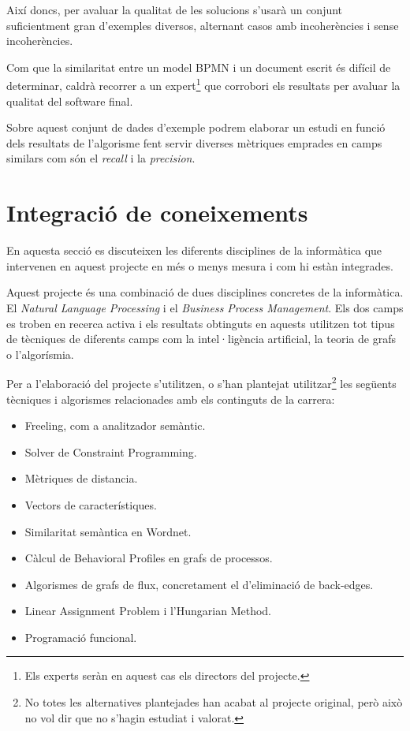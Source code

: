 Així doncs, per avaluar la qualitat de les solucions s'usarà un conjunt suficientment gran d'exemples diversos, alternant casos amb incoherències i sense incoherències. 

Com que la similaritat entre un model BPMN i un document escrit és difícil de determinar, caldrà recorrer a un expert\footnote{Els experts seràn en aquest cas els directors del projecte.} que corrobori els resultats per avaluar la qualitat del software final.

Sobre aquest conjunt de dades d'exemple podrem elaborar un estudi en funció dels resultats de l'algorisme fent servir diverses mètriques emprades en camps similars com són el \emph{recall} i la \emph{precision}.



\section{Integració de coneixements}
\label{integracio}
En aquesta secció es discuteixen les diferents disciplines de la informàtica que intervenen en aquest projecte en més o menys mesura i com hi estàn integrades.

Aquest projecte és una combinació de dues disciplines concretes de la informàtica. El \textit{Natural Language Processing} i el \textit{Business Process Management}. Els dos camps es troben en recerca activa i els resultats obtinguts en aquests utilitzen tot tipus de tècniques de diferents camps com la intel·ligència artificial, la teoria de grafs o l'algorísmia.

Per a l'elaboració del projecte s'utilitzen, o s'han plantejat utilitzar\footnote{No totes les alternatives plantejades han acabat al projecte original, però això no vol dir que no s'hagin estudiat i valorat.} les següents tècniques i algorismes relacionades amb els continguts de la carrera:

\begin{itemize}
\item Freeling, com a analitzador semàntic.
\item Solver de Constraint Programming.
\item Mètriques de distancia.
\item Vectors de característiques.
\item Similaritat semàntica en Wordnet.
\item Càlcul de Behavioral Profiles en grafs de processos.
\item Algorismes de grafs de flux, concretament el d'eliminació de back-edges.
\item Linear Assignment Problem i l'Hungarian Method.
\item Programació funcional.
\end{itemize}

